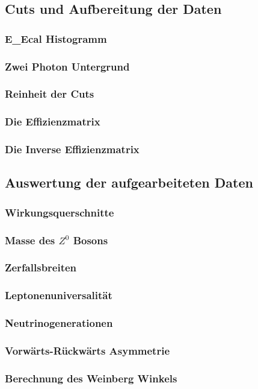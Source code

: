\subsection{Cuts und Aufbereitung der Daten}
\begin{frame}
	\frametitle{E\_Ecal Histogramm}
	
\end{frame}

\begin{frame}
	\frametitle{Zwei Photon Untergrund}
	
\end{frame}

\begin{frame}
	\frametitle{Reinheit der Cuts}
	
\end{frame}
\begin{frame}
	\frametitle{Die Effizienzmatrix}
	
\end{frame}
\begin{frame}
	\frametitle{Die Inverse Effizienzmatrix}
	
\end{frame}

\subsection{Auswertung der aufgearbeiteten Daten}
\begin{frame}
	\frametitle{Wirkungsquerschnitte}

\end{frame}
\begin{frame}
	\frametitle{Masse des $Z^0$ Bosons}
	
\end{frame}
\begin{frame}
	\frametitle{Zerfallsbreiten}
	
\end{frame}
\begin{frame}
	\frametitle{Leptonenuniversalität}
	
\end{frame}
\begin{frame}
	\frametitle{Neutrinogenerationen}
	
\end{frame}
\begin{frame}
	\frametitle{Vorwärts-Rückwärts Asymmetrie}
	
\end{frame}
\begin{frame}
	\frametitle{Berechnung des Weinberg Winkels}
	
\end{frame}





